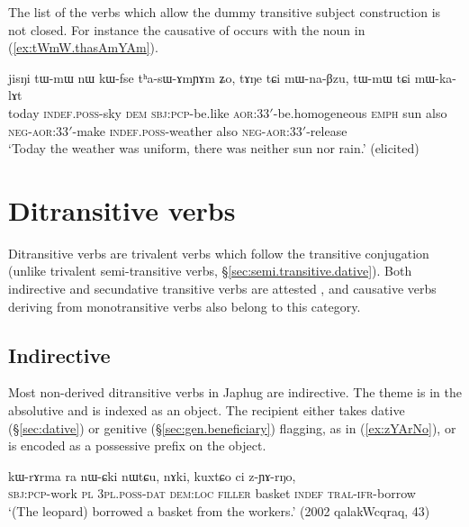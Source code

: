The list of the verbs which allow the dummy transitive subject construction is not closed. For instance the causative of  occurs with the noun  in (\ref{ex:tWmW.thasAmYAm}).

\begin{exe}
\ex \label{ex:tWmW.thasAmYAm}
\gll  jisŋi tɯ-mɯ nɯ kɯ-fse tʰa-sɯ-ɤmɲɤm ʑo, tɤŋe tɕi mɯ-na-βzu, tɯ-mɯ tɕi mɯ-ka-lɤt \\
today \textsc{indef}.\textsc{poss}-sky \textsc{dem} \textsc{sbj}:\textsc{pcp}-be.like \textsc{aor}:3\fl{}3$'$-be.homogeneous \textsc{emph} sun also \textsc{neg}-\textsc{aor}:3\fl{}3$'$-make  \textsc{indef}.\textsc{poss}-weather also \textsc{neg}-\textsc{aor}:3\fl{}3$'$-release \\ 
\glt  `Today the weather was uniform, there was neither sun nor rain.' (elicited)
\end{exe}

\section{Ditransitive verbs} \label{sec:ditransitive}
Ditransitive verbs are trivalent verbs which follow the transitive conjugation (unlike trivalent semi-transitive verbs, §\ref{sec:semi.transitive.dative}). Both indirective and secundative transitive verbs are attested \citep{malchukov10ditransitive}, and causative verbs deriving from monotransitive verbs also belong to this category.


\subsection{Indirective} \label{sec:ditransitive.indirective}
Most non-derived ditransitive verbs in Japhug are indirective. The theme is in the absolutive and is indexed as an object. The recipient either takes dative (§\ref{sec:dative}) or genitive (§\ref{sec:gen.beneficiary}) flagging, as in (\ref{ex:zYArNo}), or is encoded as a possessive prefix on the object.

\begin{exe}
	\ex \label{ex:zYArNo}
	\gll kɯ-rɤrma ra nɯ-ɕki nɯtɕu, nɤki, kuxtɕo ci z-ɲɤ-rŋo, \\
	\textsc{sbj}:\textsc{pcp}-work \textsc{pl} \textsc{3pl}.\textsc{poss}-\textsc{dat} \textsc{dem}:\textsc{loc} \textsc{filler} basket \textsc{indef} \textsc{tral}-\textsc{ifr}-borrow \\
	\glt  `(The leopard) borrowed a basket from the workers.' (2002 qalakWcqraq, 43)
\end{exe}

